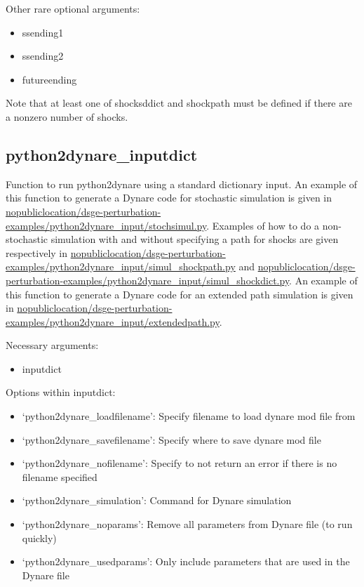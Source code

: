 \documentclass{article}
\theoremstyle{definition}
\begin{document}
Other rare optional arguments:
\begin{itemize}
    \item ssending1
    \item ssending2
    \item futureending
\end{itemize}

Note that at least one of shocksddict and shockpath must be defined if there are a nonzero number of shocks.





\subsection{python2dynare\_inputdict}
Function to run python2dynare using a standard dictionary input. An example of this function to generate a Dynare code for stochastic simulation is given in \url{nopubliclocation/dsge-perturbation-examples/python2dynare_input/stochsimul.py}. Examples of how to do a non-stochastic simulation with and without specifying a path for shocks are given respectively in \url{nopubliclocation/dsge-perturbation-examples/python2dynare_input/simul_shockpath.py} and \url{nopubliclocation/dsge-perturbation-examples/python2dynare_input/simul_shockdict.py}. An example of this function to generate a Dynare code for an extended path simulation is given in \url{nopubliclocation/dsge-perturbation-examples/python2dynare_input/extendedpath.py}.

Necessary arguments:
\begin{itemize}
    \item inputdict
\end{itemize}

Options within inputdict:
\begin{itemize}
    \item `python2dynare\_loadfilename': Specify filename to load dynare mod file from
    \item `python2dynare\_savefilename': Specify where to save dynare mod file
    \item `python2dynare\_nofilename': Specify to not return an error if there is no filename specified
    \item `python2dynare\_simulation': Command for Dynare simulation
    \item `python2dynare\_noparams': Remove all parameters from Dynare file (to run quickly)
    \item `python2dynare\_usedparams': Only include parameters that are used in the Dynare file
\end{itemize}
\end{document}
